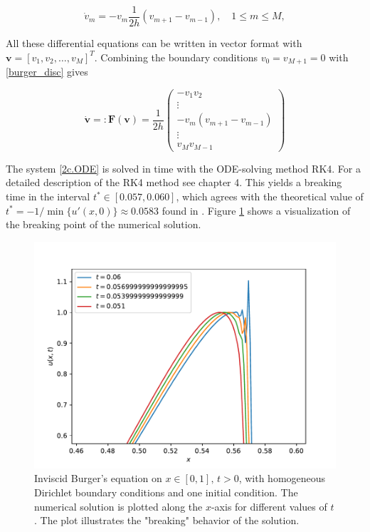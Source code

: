 \begin{equation}
    \dot{v}_m =  - v_m\frac{1}{2h}(v_{m+1}-v_{m-1}), \quad 1 \le m \le M,
\label{burger_disc}
\end{equation}

\noindent All these differential equations can be written in vector format with $\boldsymbol{v}=[v_1,v_2,\dots,v_M]^T$. Combining the boundary conditions $v_0=v_{M+1}=0$  with \eqref{burger_disc} gives 

\begin{equation}
    \dot{\boldsymbol{v}} =: \boldsymbol{F}(\boldsymbol{v}) = \frac{1}{2h} \begin{pmatrix}
    -v_1v_2 \\
    \vdots \\
    -v_m(v_{m+1} - v_{m-1}) \\
    \vdots \\
    v_{M}v_{M-1}
    \end{pmatrix}
\label{2c.ODE}
\end{equation}

\noindent The system \eqref{2c.ODE} is solved in time with the ODE-solving method RK4. For a detailed description of the RK4 method see chapter 4. This yields a breaking time in the interval $t^* \in [0.057,0.060]$, which agrees with the theoretical value of $t^* = -1/ \min\{u'(x,0)\} \approx 0.0583$ found in \cite{Burgers}. Figure \ref{2c.fig} shows a visualization of the breaking point of the numerical solution. 

\begin{figure}[t]
    \centering
    \includegraphics[width = 0.85\linewidth]{plots/2c.pdf}
    \caption{Inviscid Burger's equation on $x \in [0,1], \, t > 0$, with homogeneous Dirichlet boundary conditions and one initial condition. The numerical solution is plotted along the $x$-axis for different values of $t$. The plot illustrates the "breaking" behavior of the solution. }
    \label{2c.fig}
\end{figure}
\newpage
\ 
\newpage
\newpage
\ 
\newpage

